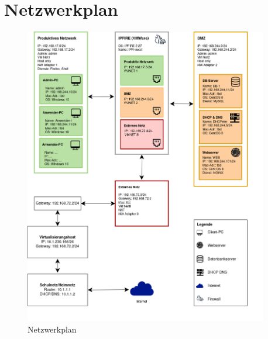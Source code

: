 \documentclass[a4paper,
    11pt,
    headings=small,
    ngerman,
    listof=totoc,
    numbers=noenddot]{scrreprt}[2021/11/13]
\begin{document}
\chapter{Netzwerkplan}

\begin{figure}[h!]
  \centering
  \includegraphics[width=0.95\textwidth]{data/Netzwerkplan.png}
  \caption{Netzwerkplan}
  \label{fig:Netzwerkplan}
\end{figure}
\end{document}
